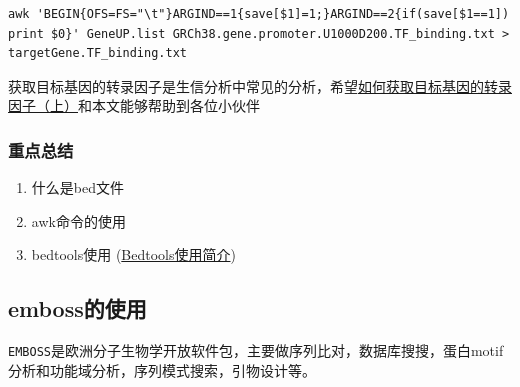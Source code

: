 \documentclass[]{article}
\numberwithin{figure}{section}
\numberwithin{table}{section}
\begin{document}
\begin{verbatim}
awk 'BEGIN{OFS=FS="\t"}ARGIND==1{save[$1]=1;}ARGIND==2{if(save[$1==1]) print $0}' GeneUP.list GRCh38.gene.promoter.U1000D200.TF_binding.txt > targetGene.TF_binding.txt
\end{verbatim}

获取目标基因的转录因子是生信分析中常见的分析，希望\href{}{如何获取目标基因的转录因子（上）}和本文能够帮助到各位小伙伴

\hypertarget{biomart_motif_10}{%
\subsubsection{重点总结}\label{biomart_motif_10}}

\begin{enumerate}
\def\labelenumi{\arabic{enumi}.}
\item
  什么是bed文件
\item
  awk命令的使用
\item
  bedtools使用 (\href{https://mp.weixin.qq.com/s/bIXom5bSDov-4sPqsTRc6A}{Bedtools使用简介})
\end{enumerate}

\hypertarget{emboss}{%
\subsection{emboss的使用}\label{emboss}}

\texttt{EMBOSS}是欧洲分子生物学开放软件包，主要做序列比对，数据库搜搜，蛋白motif分析和功能域分析，序列模式搜索，引物设计等。
\end{document}
